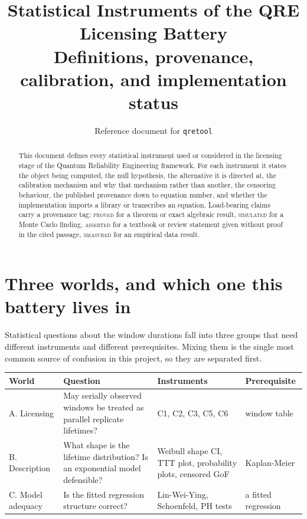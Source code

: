 \documentclass[11pt,a4paper]{article}
\title{Statistical Instruments of the QRE Licensing Battery\\
\large Definitions, provenance, calibration, and implementation status}
\author{Reference document for \texttt{qretool}}
\date{}
\newcommand{\PROVED}{\textsc{\textcolor{blue!55!black}{proved}}}
\newcommand{\SIMULATED}{\textsc{\textcolor{orange!70!black}{simulated}}}
\newcommand{\ASSERTED}{\textsc{\textcolor{purple!70!black}{asserted}}}
\newcommand{\MEASURED}{\textsc{\textcolor{green!45!black}{measured}}}
\begin{document}
\maketitle

\begin{abstract}
\noindent
This document defines every statistical instrument used or considered in the licensing
stage of the Quantum Reliability Engineering framework. For each instrument it states
the object being computed, the null hypothesis, the alternative it is directed at, the
calibration mechanism and why that mechanism rather than another, the censoring
behaviour, the published provenance down to equation number, and whether the
implementation imports a library or transcribes an equation. Load-bearing claims carry
a provenance tag: \PROVED{} for a theorem or exact algebraic result, \SIMULATED{} for a
Monte Carlo finding, \ASSERTED{} for a textbook or review statement given without proof
in the cited passage, \MEASURED{} for an empirical data result.
\end{abstract}

\tableofcontents

\section{Three worlds, and which one this battery lives in}

Statistical questions about the window durations fall into three groups that need
different instruments and different prerequisites. Mixing them is the single most common
source of confusion in this project, so they are separated first.

\begin{center}
\small
\begin{tabular}{@{}p{}p{}p{}p{}@{}}
\toprule
\textbf{World} & \textbf{Question} & \textbf{Instruments} & \textbf{Prerequisite}\\
\midrule
A. Licensing &
May serially observed windows be treated as parallel replicate lifetimes? &
C1, C2, C3, C5, C6 &
window table\\[2pt]
B. Description &
What shape is the lifetime distribution? Is an exponential model defensible? &
Weibull shape CI, TTT plot, probability plots, censored GoF &
Kaplan-Meier\\[2pt]
C. Model adequacy &
Is the fitted regression structure correct? &
Lin-Wei-Ying, Schoenfeld, PH tests &
a fitted regression\\
\bottomrule
\end{tabular}
\end{center}
\end{document}
